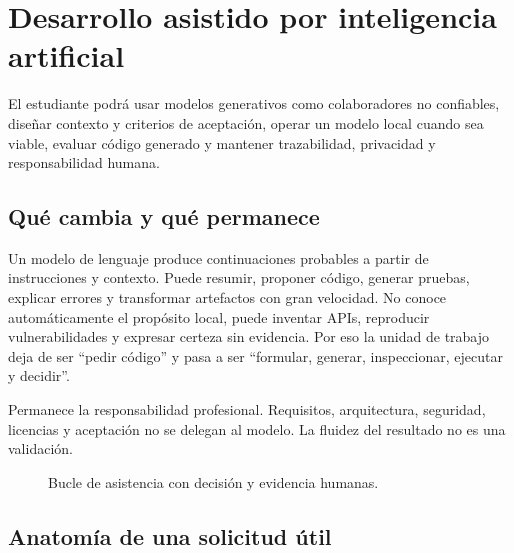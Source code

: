 \chapter{Desarrollo asistido por inteligencia artificial}
\label{chap:ia}

\begin{objetivos}
El estudiante podrá usar modelos generativos como colaboradores no confiables, diseñar contexto y criterios de aceptación, operar un modelo local cuando sea viable, evaluar código generado y mantener trazabilidad, privacidad y responsabilidad humana.
\end{objetivos}

\section{Qué cambia y qué permanece}

Un modelo de lenguaje produce continuaciones probables a partir de instrucciones y contexto. Puede resumir, proponer código, generar pruebas, explicar errores y transformar artefactos con gran velocidad. No conoce automáticamente el propósito local, puede inventar APIs, reproducir vulnerabilidades y expresar certeza sin evidencia. Por eso la unidad de trabajo deja de ser ``pedir código'' y pasa a ser ``formular, generar, inspeccionar, ejecutar y decidir''.

Permanece la responsabilidad profesional. Requisitos, arquitectura, seguridad, licencias y aceptación no se delegan al modelo. La fluidez del resultado no es una validación.

\begin{figure}[htbp]
\centering
{}
\caption{Bucle de asistencia con decisión y evidencia humanas.}
\end{figure}

\section{Anatomía de una solicitud útil}


